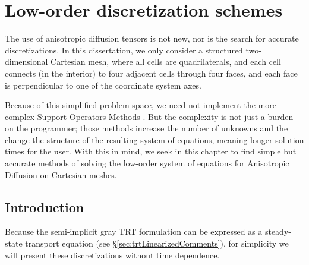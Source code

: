 
\chapter{Low-order discretization schemes}

The use of anisotropic diffusion tensors is not new, nor is the search for
accurate discretizations. In this dissertation, we only consider a structured
two-dimensional Cartesian mesh, where all cells are quadrilaterals, and each
cell connects (in
the interior) to four adjacent cells through four faces, and each face is
perpendicular to one of the coordinate system axes.

Because of this simplified problem space, we need not implement the more
complex Support Operators Methods \cite{Mor1998,Run2006}. But the complexity is
not just a burden on the programmer; those methods increase the number of
unknowns and the change the structure of the resulting system of equations,
meaning longer solution times for the user. With this in mind, we seek in this
chapter to find simple but accurate methods of solving the low-order system of
equations for Anisotropic Diffusion on Cartesian meshes.

\section{Introduction}

Because the semi-implicit gray TRT formulation can be expressed as a
steady-state transport equation (see \S\ref{sec:trtLinearizedComments}), for
simplicity we will present these discretizations without time dependence.

